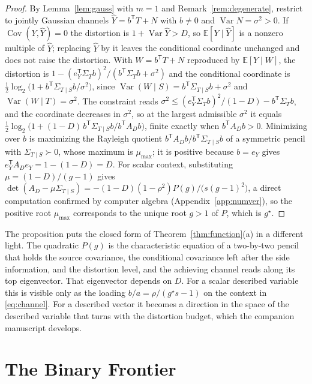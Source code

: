 \documentclass[11pt,onecolumn]{IEEEtran}
\newcommand{\E}{\mathbb{E}}
\newcommand{\Cov}{\operatorname{Cov}}
\newcommand{\hY}{\widehat{Y}}
\begin{document}
\begin{proof}
By Lemma~\ref{lem:gauss} with $m=1$ and Remark~\ref{rem:degenerate},
restrict to jointly Gaussian channels $\hY=b^{\mathsf T}T+N$ with
$b\ne0$ and $\operatorname{Var}N=\sigma^2>0$. If
$\Cov(Y,\hY)=0$ the distortion is $1+\operatorname{Var}\hY>D$, so
$\E[Y\mid\hY]$ is a nonzero multiple of $\hY$; replacing $\hY$ by it
leaves the conditional coordinate unchanged and does not raise the
distortion. With $W=b^{\mathsf T}T+N$ reproduced by $\E[Y\mid W]$, the
distortion is $1-(e_Y^{\mathsf T}\Sigma_Tb)^2/(b^{\mathsf T}\Sigma_Tb+\sigma^2)$
and the conditional coordinate is
$\tfrac12\log_2\bigl(1+b^{\mathsf T}\Sigma_{T\mid S}b/\sigma^2\bigr)$,
since $\operatorname{Var}(W\mid S)=b^{\mathsf T}\Sigma_{T\mid S}b+\sigma^2$
and $\operatorname{Var}(W\mid T)=\sigma^2$. The constraint reads
$\sigma^2\le(e_Y^{\mathsf T}\Sigma_Tb)^2/(1-D)-b^{\mathsf T}\Sigma_Tb$, and
the coordinate decreases in $\sigma^2$, so at the largest admissible
$\sigma^2$ it equals
$\tfrac12\log_2\bigl(1+(1-D)\,b^{\mathsf T}\Sigma_{T\mid S}b/b^{\mathsf T}A_Db\bigr)$,
finite exactly when $b^{\mathsf T}A_Db>0$. Minimizing over $b$ is
maximizing the Rayleigh quotient $b^{\mathsf T}A_Db/b^{\mathsf T}\Sigma_{T\mid S}b$
of a symmetric pencil with $\Sigma_{T\mid S}\succ0$, whose maximum is
$\mu_{\max}$; it is positive because $b=e_Y$ gives
$e_Y^{\mathsf T}A_De_Y=1-(1-D)=D$. For scalar context, substituting
$\mu=(1-D)/(g-1)$ gives
$\det(A_D-\mu\Sigma_{T\mid S})=-(1-D)(1-\rho^2)P(g)/\bigl(s(g-1)^2\bigr)$,
a direct computation confirmed by computer algebra
(Appendix~\ref{app:numver}), so the positive root $\mu_{\max}$
corresponds to the unique root $g>1$ of $P$, which is $g^\star$.
\end{proof}

The proposition puts the closed form of Theorem~\ref{thm:function}(a) in
a different light. The quadratic $P(g)$ is the characteristic equation of
a two-by-two pencil that holds the source covariance, the conditional
covariance left after the side information, and the distortion level, and
the achieving channel reads along its top eigenvector. That eigenvector
depends on $D$. For a scalar described variable this is visible only as
the loading $b/a=\rho/(g^\star s-1)$ on the context in \eqref{eq:channel}.
For a described vector it becomes a direction in the space of the
described variable that turns with the distortion budget, which the
companion manuscript \cite{bond2026vector} develops.

\section{The Binary Frontier}
\label{sec:binary}
\end{document}
